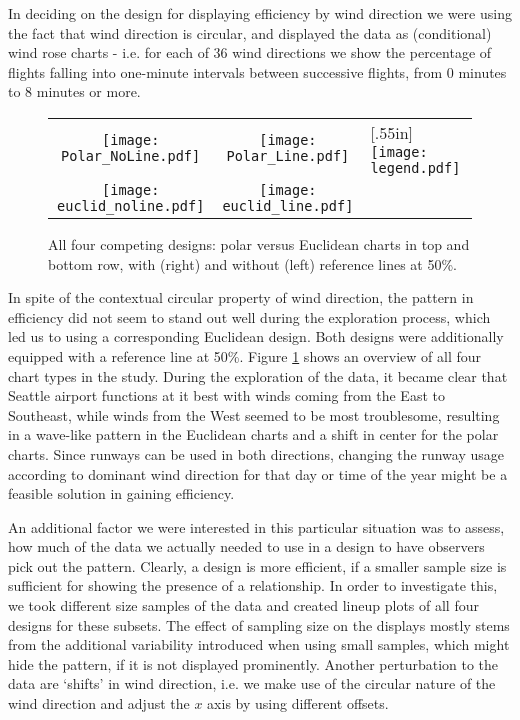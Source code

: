 In deciding on the design for displaying efficiency  by wind direction we were using the fact that wind direction is circular, and  displayed the data as (conditional) wind rose charts - i.e. for each of 36 wind directions we show the percentage of flights falling into one-minute intervals between successive flights, from  0 minutes to 8 minutes or more.


\begin{figure}[htbp] %
 \hspace{-.1in}
   \begin{tabular}{ccl}
   \texttt{[image: Polar\_NoLine.pdf]} &  \hspace{-.3in}
   \texttt{[image: Polar\_Line.pdf]}  &  \hspace{-.2in} \multirow{2}{*}[.55in]{  \texttt{[image: legend.pdf]}} \\
   \texttt{[image: euclid\_noline.pdf]} & \hspace{-.3in}
   \texttt{[image: euclid\_line.pdf]}
   \end{tabular}
   \caption{All four competing designs: polar versus Euclidean charts in top and bottom row, with (right) and without (left) reference lines at 50\%. }
   \label{layouts}
\end{figure}

In spite of the contextual circular property of wind direction, the pattern in efficiency did not seem to stand out well during the exploration process, which led us to using a corresponding  Euclidean design. Both designs were additionally equipped with a reference line at 50\%. 
Figure \ref{layouts} shows an overview of all four chart types in the study. During the exploration of the data, it became clear that Seattle airport functions at it best with winds coming from the East to Southeast, while winds from the West seemed to be most troublesome, resulting in a wave-like pattern in the Euclidean charts and a shift in center for the polar charts. Since runways can be used in both directions, changing the runway usage according to dominant wind direction for that day or time of the year might be a feasible solution in gaining efficiency. 

An additional factor we were interested in this particular situation was to assess, how much of the data we actually needed to use in a design to have observers pick out the pattern. Clearly, a design is more efficient, if a smaller sample size is sufficient for showing the presence of a relationship. In order to investigate this, we took different size samples of the data and created lineup plots of all four designs for these subsets. The effect of sampling size on the displays mostly stems from the additional variability introduced when using small samples, which might hide the pattern, if it is not displayed prominently. 
Another perturbation to the data are `shifts' in wind direction, i.e. we make use of the circular nature of the wind direction and adjust the $x$ axis by using different offsets.

